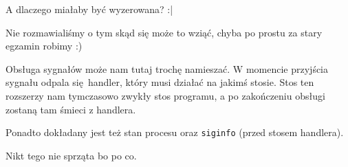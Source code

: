 A dlaczego miałaby być wyzerowana? :|

Nie rozmawialiśmy o tym skąd się może to wziąć, chyba po prostu za stary egzamin robimy :)

Obsługa sygnałów może nam tutaj trochę namieszać.
W momencie przyjścia sygnału odpala się handler, który musi działać na jakimś stosie. Stos ten rozszerzy nam tymczasowo
zwykły stos programu, a po zakończeniu obsługi zostaną tam śmieci z handlera.

Ponadto dokładany jest też stan procesu oraz \texttt{siginfo} (przed stosem handlera).

Nikt tego nie sprząta bo po co.